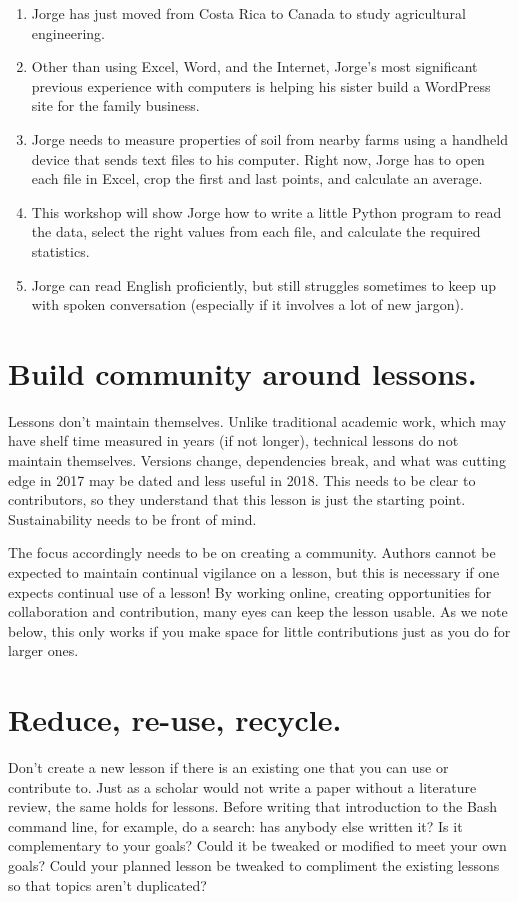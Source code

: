 \documentclass[10pt,letterpaper]{article}
\newcommand{\rulemajor}[1]{\section{#1}}
\begin{document}
\begin{enumerate}

\item
  Jorge has just moved from Costa Rica to Canada
  to study agricultural engineering.

\item
  Other than using Excel, Word, and the Internet,
  Jorge's most significant previous experience with computers is
  helping his sister build a WordPress site for the family business.

\item
  Jorge needs to measure properties of soil from nearby farms
  using a handheld device that sends text files to his computer.
  Right now, Jorge has to open each file in Excel,
  crop the first and last points,
  and calculate an average.

\item
  This workshop will show Jorge how to write a little Python program
  to read the data,
  select the right values from each file,
  and calculate the required statistics.

\item
  Jorge can read English proficiently,
  but still struggles sometimes to keep up with spoken conversation
  (especially if it involves a lot of new jargon).

\end{enumerate}

\rulemajor{Build community around lessons.}

Lessons don't maintain themselves. 
Unlike traditional academic work, 
which may have shelf time measured 
in years (if not longer), 
technical lessons do not maintain themselves. 
Versions change, dependencies break, 
and what was cutting edge in 2017 may be dated 
and less useful in 2018. 
This needs to be clear to contributors, 
so they understand that this lesson is just 
the starting point. 
Sustainability needs to be front of mind.

The focus accordingly needs to be on creating a community. 
Authors cannot be expected to maintain continual vigilance on a lesson,
but this is necessary if one expects continual use of a lesson! 
By working online, creating opportunities for collaboration 
and contribution, many eyes can keep the lesson usable. 
As we note below, 
this only works if you make space for 
little contributions just as you do for larger ones.

\rulemajor{Reduce, re-use, recycle.}

Don't create a new lesson if there is an existing one that you can use or contribute to.
Just as a scholar would not write a paper without a literature review,
the same holds for lessons.
Before writing that introduction to the Bash command line,
for example,
do a search:
has anybody else written it?
Is it complementary to your goals?
Could it be tweaked or modified to meet your own goals?
Could your planned lesson be tweaked to compliment the existing lessons so that topics aren't duplicated? 
\end{document}
